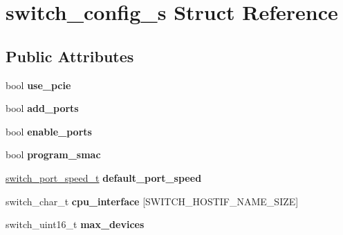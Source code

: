 \hypertarget{structswitch__config__s}{\section{switch\+\_\+config\+\_\+s Struct Reference}
\label{structswitch__config__s}
}
\subsection*{Public Attributes}
\begin{DoxyCompactItemize}
\item 
\hypertarget{structswitch__config__s_a3872592411f8267692adc424d5168853}{bool {\bfseries use\+\_\+pcie}}\label{structswitch__config__s_a3872592411f8267692adc424d5168853}

\item 
\hypertarget{structswitch__config__s_a61ce6e369f80e4cb8a7b0d4583de6712}{bool {\bfseries add\+\_\+ports}}\label{structswitch__config__s_a61ce6e369f80e4cb8a7b0d4583de6712}

\item 
\hypertarget{structswitch__config__s_a0bbb9925f20125be5527690097852561}{bool {\bfseries enable\+\_\+ports}}\label{structswitch__config__s_a0bbb9925f20125be5527690097852561}

\item 
\hypertarget{structswitch__config__s_a5de0b9e2318779fc0881ed6ef03835ce}{bool {\bfseries program\+\_\+smac}}\label{structswitch__config__s_a5de0b9e2318779fc0881ed6ef03835ce}

\item 
\hypertarget{structswitch__config__s_a5cebf3d6d419e76a1440036e6254c796}{\hyperlink{group__Port_ga29ae043889998625e4f817091229005c}{switch\+\_\+port\+\_\+speed\+\_\+t} {\bfseries default\+\_\+port\+\_\+speed}}\label{structswitch__config__s_a5cebf3d6d419e76a1440036e6254c796}

\item 
\hypertarget{structswitch__config__s_a0b419355c88f18bce7937986d75a8ff7}{switch\+\_\+char\+\_\+t {\bfseries cpu\+\_\+interface} \mbox{[}S\+W\+I\+T\+C\+H\+\_\+\+H\+O\+S\+T\+I\+F\+\_\+\+N\+A\+M\+E\+\_\+\+S\+I\+Z\+E\mbox{]}}\label{structswitch__config__s_a0b419355c88f18bce7937986d75a8ff7}

\item 
\hypertarget{structswitch__config__s_ab56afe8cc3dd74fe26afcd7d304f8db8}{switch\+\_\+uint16\+\_\+t {\bfseries max\+\_\+devices}}\label{structswitch__config__s_ab56afe8cc3dd74fe26afcd7d304f8db8}


\end{DoxyCompactItemize}
